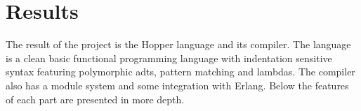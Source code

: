 \chapter{Results}

The result of the project is the Hopper language and its compiler. The language is a clean basic functional programming language with indentation sensitive syntax featuring polymorphic \glspl{adt}, pattern matching and lambdas. The compiler also has a module system and some integration with Erlang. Below the features of each part are presented in more depth. 





